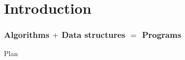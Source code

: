 
\part{Introduction}






%


%




\section{Algorithms $+$ Data structures $=$ Programs}

\begin{frame}{Plan}

\tableofcontents

\end{frame}

